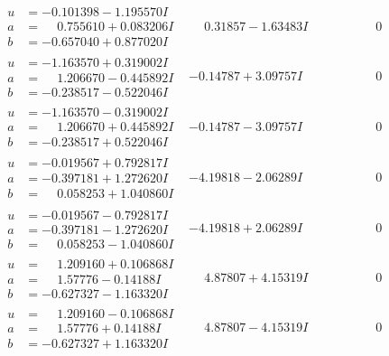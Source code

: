 \documentclass[1p]{elsarticle_modified}
\theoremstyle{definition}
\begin{document}
$$\begin{array}{c|c|c}
\begin{aligned}
u &= -0.101398 - 1.195570 I \\
a &= \phantom{-}0.755610 + 0.083206 I \\
b &= -0.657040 + 0.877020 I\end{aligned}
 & \phantom{-}0.31857 - 1.63483 I & \phantom{-0.000000 } 0 \\ \hline\begin{aligned}
u &= -1.163570 + 0.319002 I \\
a &= \phantom{-}1.206670 - 0.445892 I \\
b &= -0.238517 - 0.522046 I\end{aligned}
 & -0.14787 + 3.09757 I & \phantom{-0.000000 } 0 \\ \hline\begin{aligned}
u &= -1.163570 - 0.319002 I \\
a &= \phantom{-}1.206670 + 0.445892 I \\
b &= -0.238517 + 0.522046 I\end{aligned}
 & -0.14787 - 3.09757 I & \phantom{-0.000000 } 0 \\ \hline\begin{aligned}
u &= -0.019567 + 0.792817 I \\
a &= -0.397181 + 1.272620 I \\
b &= \phantom{-}0.058253 + 1.040860 I\end{aligned}
 & -4.19818 - 2.06289 I & \phantom{-0.000000 } 0 \\ \hline\begin{aligned}
u &= -0.019567 - 0.792817 I \\
a &= -0.397181 - 1.272620 I \\
b &= \phantom{-}0.058253 - 1.040860 I\end{aligned}
 & -4.19818 + 2.06289 I & \phantom{-0.000000 } 0 \\ \hline\begin{aligned}
u &= \phantom{-}1.209160 + 0.106868 I \\
a &= \phantom{-}1.57776 - 0.14188 I \\
b &= -0.627327 - 1.163320 I\end{aligned}
 & \phantom{-}4.87807 + 4.15319 I & \phantom{-0.000000 } 0 \\ \hline\begin{aligned}
u &= \phantom{-}1.209160 - 0.106868 I \\
a &= \phantom{-}1.57776 + 0.14188 I \\
b &= -0.627327 + 1.163320 I\end{aligned}
 & \phantom{-}4.87807 - 4.15319 I & \phantom{-0.000000 } 0 \\ \hline\begin{aligned}

\end{aligned}
\end{array}$$
\end{document}
